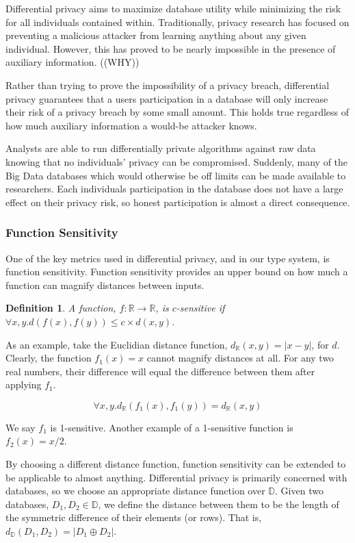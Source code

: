 \documentclass[12pt]{article}
\newtheorem{defn}{Definition}[section]
\begin{document}
Differential privacy aims to maximize database utility while minimizing the risk for all individuals contained within.
Traditionally, privacy research has focused on preventing a malicious attacker from learning anything about any given individual.
However, this has proved to be nearly impossible in the presence of auxiliary information. ((WHY))

Rather than trying to prove the impossibility of a privacy breach, differential privacy guarantees that a users participation in a database will only increase their risk of a privacy breach by some small amount.
This holds true regardless of how much auxiliary information a would-be attacker knows.

Analysts are able to run differentially private algorithms against raw data knowing that no individuals' privacy can be compromised.
Suddenly, many of the Big Data databases which would otherwise be off limits can be made available to researchers.
Each individuals participation in the database does not have a large effect on their privacy risk, so honest participation is almost a direct consequence.

\subsubsection{Function Sensitivity}

One of the key metrics used in differential privacy, and in our type system, is function sensitivity.
Function sensitivity provides an upper bound on how much a function can magnify distances between inputs.

\begin{defn}
  A function, $f : \mathbb{R} \rightarrow \mathbb{R}$, is $c$-sensitive if
  $\forall x,y.d(f(x),f(y)) \le c \times d(x,y)$.
\end{defn}

As an example, take the Euclidian distance function, $d_\mathbb{R}(x,y) = |x - y|$, for $d$.
Clearly, the function $f_1(x)=x$ cannot magnify distances at all.
For any two real numbers, their difference will equal the difference between them after applying $f_1$.

\[
  \forall x,y.d_\mathbb{R}(f_1(x),f_1(y)) = d_\mathbb{R}(x,y)
\]

We say $f_1$ is 1-sensitive.
Another example of a 1-sensitive function is $f_2(x) = x/2$.

By choosing a different distance function, function sensitivity can be extended to be applicable to almost anything.
Differential privacy is primarily concerned with databases, so we choose an appropriate distance function over $\mathbb{D}$.
Given two databases, $D_1, D_2 \in \mathbb{D}$, we define the distance between them to be the length of the symmetric difference of their elements (or rows).
That is, $d_\mathbb{D}(D_1,D_2) = |D_1 \oplus D_2|$.
\end{document}
